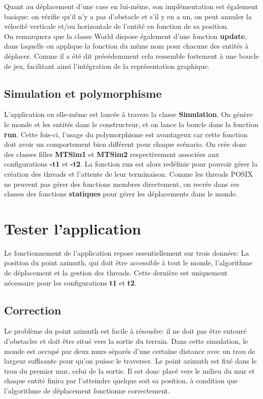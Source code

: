\documentclass[11pt]{article} %
\begin{document}
Quant au déplacement d'une case en lui-même, son implémentation est également basique: on vérifie qu'il n'y a pas d'obstacle et s'il y en a un, on peut annuler la vélocité verticale et/ou horizontale de l'entité en fonction de sa position. \\
On remarquera que la classe World dispose également d'une fonction \textbf{update}, dans laquelle on applique la fonction du même nom pour chacune des entités à déplacer. Comme il a été dit précédemment cela ressemble fortement à une boucle de jeu, facilitant ainsi l'intégration de la représentation graphique.


\subsection{Simulation et polymorphisme}
L'application en elle-même est lancée à travers la classe \textbf{Simulation}. On génère le monde et les entités dans le constructeur, et on lance la boucle dans la fonction \textbf{run}. Cette fois-ci, l'usage du polymorphisme est avantageux car cette fonction doit avoir un comportement bien différent pour chaque scénario. On crée donc des classes filles \textbf{MTSim1} et \textbf{MTSim2} respectivement associées aux configurations \textbf{-t1} et \textbf{-t2}. La fonction run est alors redéfinie pour pouvoir gérer la création des threads et l'attente de leur terminaison. Comme les threads POSIX ne peuvent pas gérer des fonctions membres directement, on recrée dans ces classes des fonctions \textbf{statiques} pour gérer les déplacements dans le monde. 

\section{Tester l'application}
Le fonctionnement de l'application repose essentiellement sur trois données: La position du point azimuth, qui doit être accessible à tout le monde, l'algorithme de déplacement et la gestion des threads. Cette dernière est uniquement nécessaire pour les configurations \textbf{t1} et \textbf{t2}.

\subsection{Correction}

Le problème du point azimuth est facile à résoudre: il ne doit pas être entouré d'obstacles et doit être situé vers la sortie du terrain. Dans cette simulation, le monde est occupé par deux murs séparés d'une certaine distance avec un trou de largeur suffisante pour qu'on puisse le traverser. Le point azimuth est fixé dans le trou du premier mur, celui de la sortie. Il est donc placé vers le milieu du mur et chaque entité finira par l'atteindre quelque soit sa position, à condition que l'algorithme de déplacement fonctionne correctement.
\end{document}
